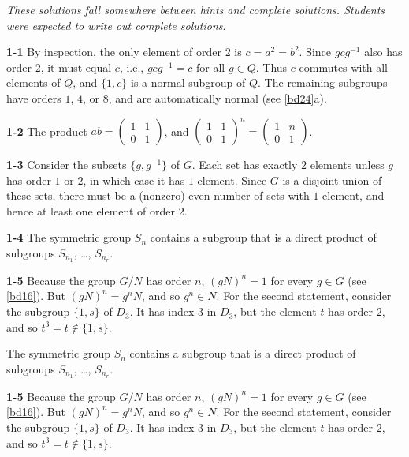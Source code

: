 \documentclass[a4paper,11pt,final,openany]{memoir}%
\theoremstyle{nonumberplain}
\begin{document}
\textit{These solutions fall somewhere between hints
and complete solutions. Students were expected to write out complete
solutions}.

\bigskip\noindent\textbf{1-1}
By inspection, the only element of order $2$ is $c=a^{2}=b^{2}$. Since
$gcg^{-1}$ also has order $2$, it must equal $c$, i.e., $gcg^{-1}=c$ for all
$g\in Q$. Thus $c$ commutes with all elements of $Q$, and $\{1,c\}$ is a
normal subgroup of $Q$. The remaining subgroups have orders $1$, $4$, or $8$,
and are automatically normal (see \ref{bd24}a).

\bigskip\noindent\textbf{1-2}
The product $ab=%
\begin{pmatrix}
1 & 1\\
0 & 1
\end{pmatrix}
$, and $%
\begin{pmatrix}
1 & 1\\
0 & 1
\end{pmatrix}
^{n}=%
\begin{pmatrix}
1 & n\\
0 & 1
\end{pmatrix}
$.

\bigskip\noindent\textbf{1-3}
Consider the subsets $\{g,g^{-1}\}$ of $G$. Each set has exactly $2$ elements
unless $g$ has order $1$ or $2$, in which case it has $1$ element. Since $G$
is a disjoint union of these sets, there must be a (nonzero) even number of
sets with $1$ element, and hence at least one element of order $2$.

\bigskip\noindent\textbf{1-4}
The symmetric group $S_{n}$ contains a subgroup that is a direct product of
subgroups $S_{n_{1}}$, \ldots, $S_{n_{r}}$.

\bigskip\noindent\textbf{1-5}
Because the group $G/N$ has order $n$, $(gN)^{n}=1$ for every $g\in G$ (see
\ref{bd16}). But $(gN)^{n}=g^{n}N$, and so $g^{n}\in N$. For the second
statement, consider the subgroup $\{1,s\}$ of $D_{3}$. It has index $3$ in
$D_{3}$, but the element $t$ has order $2$, and so $t^{3}=t\notin\{1,s\}$.

The symmetric group $S_{n}$ contains a subgroup that is a direct product of
subgroups $S_{n_{1}}$, \ldots, $S_{n_{r}}$.

\medskip\noindent\textbf{1-5}
Because the group $G/N$ has order $n$, $(gN)^{n}=1$ for every $g\in G$ (see
\ref{bd16}). But $(gN)^{n}=g^{n}N$, and so $g^{n}\in N$. For the second
statement, consider the subgroup $\{1,s\}$ of $D_{3}$. It has index $3$ in
$D_{3}$, but the element $t$ has order $2$, and so $t^{3}=t\notin\{1,s\}$.
\end{document}
